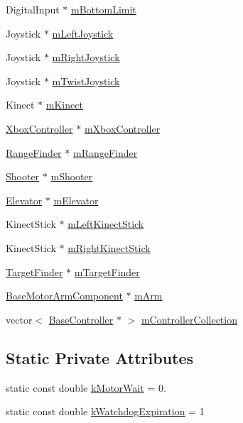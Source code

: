 \begin{DoxyCompactItemize}
\item 
\-Digital\-Input $\ast$ \hyperlink{class_main_robot_a3493db194b1541e9ba6417a130f2c167}{m\-Bottom\-Limit}
\item 
\-Joystick $\ast$ \hyperlink{class_main_robot_a7aba3a785cdb33afb26916c4ba1b977f}{m\-Left\-Joystick}
\item 
\-Joystick $\ast$ \hyperlink{class_main_robot_a11d16a0a8a5216cedb29cc2affe8657c}{m\-Right\-Joystick}
\item 
\-Joystick $\ast$ \hyperlink{class_main_robot_a93c7b0ef0ea295e83c2b5dc7f006516f}{m\-Twist\-Joystick}
\item 
\-Kinect $\ast$ \hyperlink{class_main_robot_ad6e81885bc91b6a61320eef719e78b85}{m\-Kinect}
\item 
\hyperlink{class_xbox_controller}{\-Xbox\-Controller} $\ast$ \hyperlink{class_main_robot_a097d8b9d4c41f1ddf0ea95522969d46f}{m\-Xbox\-Controller}
\item 
\hyperlink{class_range_finder}{\-Range\-Finder} $\ast$ \hyperlink{class_main_robot_a5f0eac828cc63df5ff95244cbc54933c}{m\-Range\-Finder}
\item 
\hyperlink{class_shooter}{\-Shooter} $\ast$ \hyperlink{class_main_robot_ae1a1727a4b2441215d9c756100dea0d9}{m\-Shooter}
\item 
\hyperlink{class_elevator}{\-Elevator} $\ast$ \hyperlink{class_main_robot_a26cd14099f6d1fa7a1688de50608ce84}{m\-Elevator}
\item 
\-Kinect\-Stick $\ast$ \hyperlink{class_main_robot_aea5c68bbc133d2353f09a801b4a75b20}{m\-Left\-Kinect\-Stick}
\item 
\-Kinect\-Stick $\ast$ \hyperlink{class_main_robot_a46bf11190f370fc2dcff59000e9443f4}{m\-Right\-Kinect\-Stick}
\item 
\hyperlink{class_target_finder}{\-Target\-Finder} $\ast$ \hyperlink{class_main_robot_abe4f2b3d49a5eeae4ba4dd708c592b7e}{m\-Target\-Finder}
\item 
\hyperlink{class_base_motor_arm_component}{\-Base\-Motor\-Arm\-Component} $\ast$ \hyperlink{class_main_robot_ab546e398e21420c01448ab3e69e97d8f}{m\-Arm}
\item 
vector$<$ \hyperlink{class_base_controller}{\-Base\-Controller} $\ast$ $>$ \hyperlink{class_main_robot_a7efe6ec510194b6a8e7086a0fca9036d}{m\-Controller\-Collection}
\end{DoxyCompactItemize}
\subsection*{\-Static \-Private \-Attributes}
\begin{DoxyCompactItemize}
\item 
static const double \hyperlink{class_main_robot_a4e6229fb0a09d81783c6ac16258329b2}{k\-Motor\-Wait} = 0.
\item 
static const double \hyperlink{class_main_robot_a51bf97ba67ef557e633ae4456ddbb257}{k\-Watchdog\-Expiration} = 1
\end{DoxyCompactItemize}


